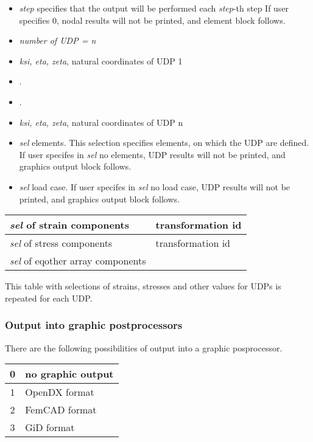 \begin{itemize}
\item[] {\it step} specifies that the output will be performed each {\it step}-th step
If user specifies 0, nodal results will not be printed, and element block follows.
\item[] {\it number of UDP = n}
\item[] {\it ksi, eta, zeta}, natural coordinates of UDP 1
\item[] .
\item[] .
\item[] {\it ksi, eta, zeta}, natural coordinates of UDP n
\item[] {\it sel} elements. This selection specifies elements, on which
the UDP are defined. If user specifes in {\it sel} no elements, 
UDP results will not be printed, and graphics output block follows.
\item[] {\it sel} load case. If user specifes in {\it sel} no load case, UDP results
will not be printed, and graphics output block follows.
\end{itemize}

\begin{center}
\begin{tabular}{|l|l|}
\hline
{\it sel} of strain components & transformation id
\\ \hline
{\it sel} of stress components &  transformation id
\\ \hline
{\it sel} of eqother array components &
\\ \hline
\end{tabular}
\end{center}

This table with selections of strains, stresses and other values for UDPs is repeated
for each UDP.

\subsubsection{Output into graphic postprocessors}
There are the following possibilities of output into a graphic posprocessor.

\begin{center}
\begin{tabular}{|c|l|}
\hline
 0 & no graphic output
\\ \hline
 1 & OpenDX format
\\ \hline
 2 & FemCAD format
\\ \hline
 3 & GiD format
\\ \hline
\end{tabular}
\end{center}

